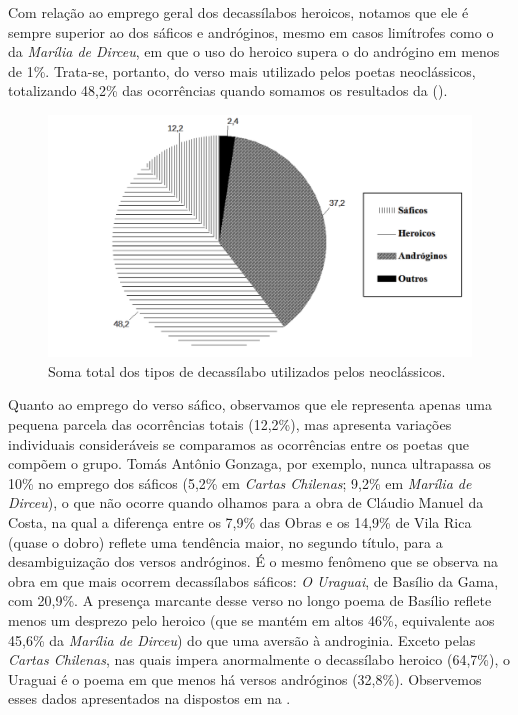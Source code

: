 \documentclass[portuguese]{textolivre}
\begin{document}
Com relação ao emprego geral dos decassílabos heroicos, notamos que ele é sempre superior ao dos sáficos e andróginos, mesmo em casos limítrofes como o da \textit{Marília de Dirceu}, em que o uso do heroico supera o do andrógino em menos de  1\%. Trata-se, portanto, do verso mais utilizado pelos poetas neoclássicos, totalizando 48,2\% das ocorrências quando somamos os resultados da  ().

\begin{figure}[!h]
    \centering
    \begin{minipage}{0.75\linewidth}
    \includegraphics[width=\linewidth]{fig-001.pdf}
    \caption{Soma total dos tipos de decassílabo utilizados pelos neoclássicos.}
    \label{fig1}
    \end{minipage}
\end{figure}

Quanto ao emprego do verso sáfico, observamos que ele representa apenas uma pequena parcela das ocorrências totais (12,2\%), mas apresenta variações individuais consideráveis se comparamos as ocorrências entre os poetas que compõem o grupo. Tomás Antônio Gonzaga, por exemplo, nunca ultrapassa os 10\% no emprego dos sáficos (5,2\% em \textit{Cartas Chilenas}; 9,2\% em \textit{Marília de Dirceu}), o que não ocorre quando olhamos para a obra de Cláudio Manuel da Costa, na qual a diferença entre os 7,9\% das Obras e os 14,9\% de Vila Rica (quase o dobro) reflete uma tendência maior, no segundo título, para a desambiguização dos versos andróginos. É o mesmo fenômeno que se observa na obra em que mais ocorrem decassílabos sáficos: \textit{O Uraguai}, de Basílio da Gama, com 20,9\%. A presença marcante desse verso no longo poema de Basílio reflete menos um desprezo pelo heroico (que se mantém em altos 46\%, equivalente aos 45,6\% da \textit{Marília de Dirceu}) do que uma aversão à androginia. Exceto pelas \textit{Cartas Chilenas}, nas quais impera anormalmente o decassílabo heroico (64,7\%), o Uraguai é o poema em que menos há versos andróginos (32,8\%). Observemos esses dados apresentados na  dispostos em na .
\end{document}
